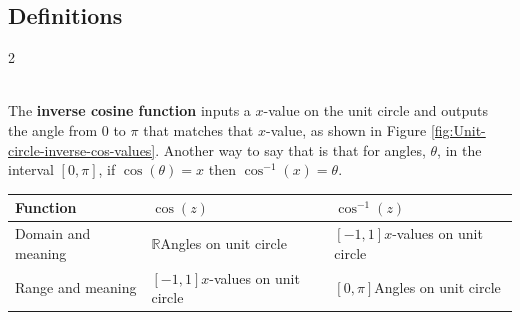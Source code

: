 \newpage

\subsection*{Definitions} \label{definitions-section-inverse-trig}

\begin{multicols}{2}
	\begin{myDefinition}~\\[0.5mm]
		The \textbf{inverse cosine function} inputs a $x$-value on the unit circle and outputs the angle from $0$ to $\pi$ that matches that $x$-value, as shown in Figure \ref{fig:Unit-circle-inverse-cos-values}. Another way to say that is that for angles, $\theta$, in the interval $\left[0,\pi\right]$, if $\cos(\theta)=x$ then $\cos^{-1}(x)=\theta$.
		\begin{center}\captionsetup{type=table}\label{table:section-inverse-trig-definition-cosine-inverse}
			\renewcommand{\arraystretch}{1.5}
			\begin{tabular}{|| p{2.3cm} | p{2.3cm} | p{2.3cm} ||}
				\hline
				Function			& $\cos(z)$										& $\cos^{-1}(z)$									\\
				\hline
				Domain and meaning	& $\mathbb{R}$\newline Angles on unit circle	& $[-1,1]$\newline $x$-values on unit circle		\\
				\hline
				Range and meaning	& $[-1,1]$\newline $x$-values on unit circle	& $\left[0,\pi\right]$\newline Angles on unit circle	\\
				\hline
			\end{tabular}
		\end{center}
		\columnbreak
		\begin{center}
			\captionsetup{type=figure}
\end{center}
\end{myDefinition}
\end{multicols}
